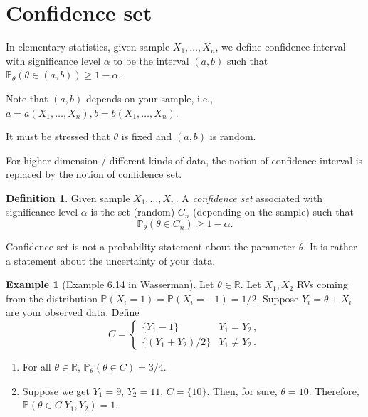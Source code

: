 \documentclass[
  openany]{book}
\theoremstyle{definition}
\newtheorem{definition}{Definition}[chapter]
\theoremstyle{definition}
\newtheorem{example}{Example}[chapter]
\theoremstyle{definition}
\theoremstyle{definition}
\theoremstyle{remark}
\begin{document}
\section{Confidence set}\label{confidence-set}

In elementary statistics,
given sample \(X_1, \dots, X_n\),
we define confidence interval with significance level \(\alpha\)
to be the interval \((a,b)\) such that \(\mathbb{P}_\theta( \theta \in (a,b) ) \geq 1 - \alpha\).

Note that \((a,b)\) depends on your sample, i.e.,
\(a = a(X_1, \dots, X_n), b = b(X_1, \dots, X_n)\).

It must be stressed that \(\theta\) is fixed and \((a,b)\) is random.

For higher dimension / different kinds of data, the notion of confidence interval
is replaced by the notion of confidence set.

\begin{definition}
Given sample \(X_1, \dots, X_n\).
A \emph{confidence set} associated with significance level \(\alpha\) is the set (random) \(C_n\) (depending on the sample)
such that
\[ \mathbb{P}_\theta(\theta \in C_n) \geq 1 - \alpha. \]
\end{definition}

Confidence set is not a probability statement about the parameter \(\theta\). It is
rather a statement about the uncertainty of your data.

\begin{example}[Example 6.14 in Wasserman]

Let \(\theta \in \mathbb{R}\). Let \(X_1, X_2\) RVs coming from the distribution
\(\mathbb{P}(X_i = 1) = \mathbb{P}(X_i = -1) = 1/2\).
Suppose \(Y_i = \theta + X_i\) are your observed data.
Define
\[ C = \begin{cases}
    \{ Y_1 - 1\} & Y_1 = Y_2 \,, \\
    \{ (Y_1 + Y_2)/2 \} & Y_1 \not= Y_2 \,.
\end{cases}\]

\begin{enumerate}
\def\labelenumi{\arabic{enumi}.}
\item
  For all \(\theta\in \mathbb{R}\), \(\mathbb{P}_\theta(\theta \in C ) = 3/4\).
\item
  Suppose we get \(Y_1 = 9\), \(Y_2 = 11\), \(C = \{ 10 \}\). Then, for sure, \(\theta = 10\).
  Therefore,
  \(\mathbb{P}(\theta \in C | Y_1, Y_2) = 1\).
\end{enumerate}

\end{example}
\end{document}
